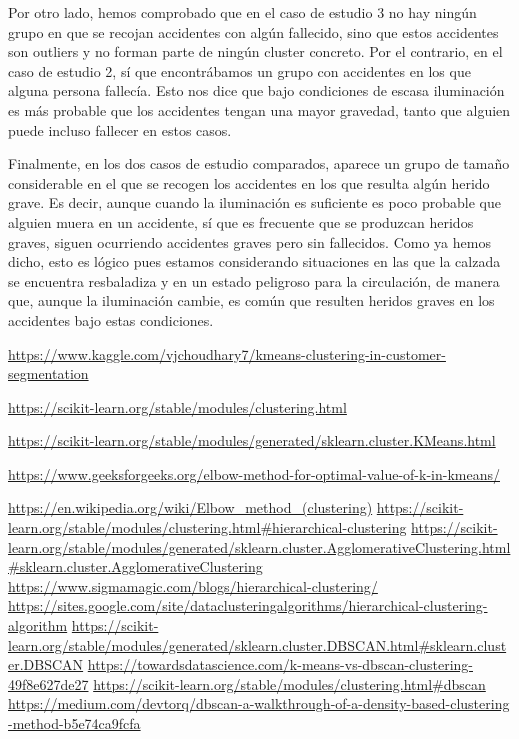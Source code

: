 \documentclass[a4paper,11pt]{book}
\begin{document}
Por otro lado, hemos comprobado que en el caso de estudio 3 no hay ningún grupo en que se recojan accidentes con algún fallecido, sino que estos accidentes son outliers y no forman parte de ningún cluster concreto. Por el contrario, en el caso de estudio 2, sí que encontrábamos un grupo con accidentes en los que alguna persona fallecía. Esto nos dice que bajo condiciones de escasa iluminación es más probable que los accidentes tengan una mayor gravedad, tanto que alguien puede incluso fallecer en estos casos. 

Finalmente, en los dos casos de estudio comparados, aparece un grupo de tamaño considerable en el que se recogen los accidentes en los que resulta algún herido grave. Es decir, aunque cuando la iluminación es suficiente es poco probable que alguien muera en un accidente, sí que es frecuente que se produzcan heridos graves, siguen ocurriendo accidentes graves pero sin fallecidos. Como ya hemos dicho, esto es lógico pues estamos considerando situaciones en las que la calzada se encuentra resbaladiza y en un estado peligroso para la circulación, de manera que, aunque la iluminación cambie, es común que resulten heridos graves en los accidentes bajo estas condiciones. 

\begin{thebibliography}{9}
\url{https://www.kaggle.com/vjchoudhary7/kmeans-clustering-in-customer-segmentation}

\url{https://scikit-learn.org/stable/modules/clustering.html}

\url{https://scikit-learn.org/stable/modules/generated/sklearn.cluster.KMeans.html}

\url{https://www.geeksforgeeks.org/elbow-method-for-optimal-value-of-k-in-kmeans/}

\url{https://en.wikipedia.org/wiki/Elbow_method_(clustering)}
\url{https://scikit-learn.org/stable/modules/clustering.html#hierarchical-clustering}
\url{https://scikit-learn.org/stable/modules/generated/sklearn.cluster.AgglomerativeClustering.html#sklearn.cluster.AgglomerativeClustering}
\url{https://www.sigmamagic.com/blogs/hierarchical-clustering/}
\url{https://sites.google.com/site/dataclusteringalgorithms/hierarchical-clustering-algorithm}
\url{https://scikit-learn.org/stable/modules/generated/sklearn.cluster.DBSCAN.html#sklearn.cluster.DBSCAN}
\url{https://towardsdatascience.com/k-means-vs-dbscan-clustering-49f8e627de27}
\url{https://scikit-learn.org/stable/modules/clustering.html#dbscan}
\url{https://medium.com/devtorq/dbscan-a-walkthrough-of-a-density-based-clustering
-method-b5e74ca9fcfa}

\end{thebibliography}
\end{document}
